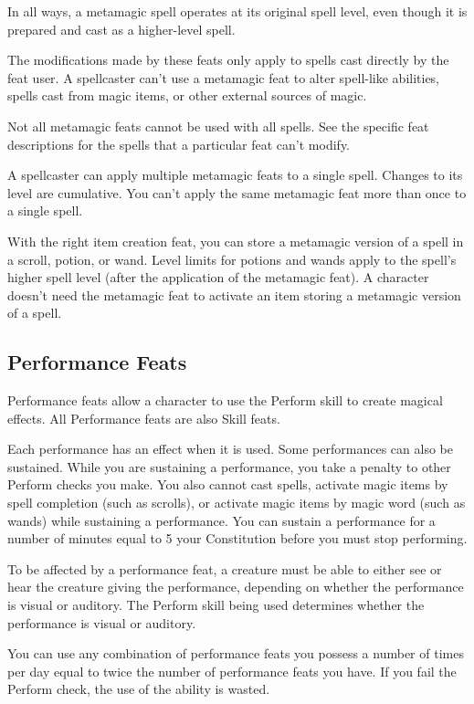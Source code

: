In all ways, a metamagic spell operates at its original spell level, even though it is prepared and cast as a higher-level spell.

The modifications made by these feats only apply to spells cast directly by the feat user.
A spellcaster can't use a metamagic feat to alter spell-like abilities, spells cast from magic items, or other external sources of magic.

Not all metamagic feats cannot be used with all spells.
See the specific feat descriptions for the spells that a particular feat can't modify.

A spellcaster can apply multiple metamagic feats to a single spell.
Changes to its level are cumulative.
You can't apply the same metamagic feat more than once to a single spell.

With the right item creation feat, you can store a metamagic version of a spell in a scroll, potion, or wand.
Level limits for potions and wands apply to the spell's higher spell level (after the application of the metamagic feat).
A character doesn't need the metamagic feat to activate an item storing a metamagic version of a spell.

\subsection{Performance Feats}
Performance feats allow a character to use the Perform skill to create magical effects.
All Performance feats are also Skill feats.

Each performance has an effect when it is used.
Some performances can also be sustained.
While you are sustaining a performance, you take a  penalty to other Perform checks you make.
You also cannot cast spells, activate magic items by spell completion (such as scrolls), or activate magic items by magic word (such as wands) while sustaining a performance.
You can sustain a performance for a number of minutes equal to 5 \add your Constitution before you must stop performing.

To be affected by a performance feat, a creature must be able to either see or hear the creature giving the performance, depending on whether the performance is visual or auditory.
The Perform skill being used determines whether the performance is visual or auditory.

You can use any combination of performance feats you possess a number of times per day equal to twice the number of performance feats you have.
If you fail the Perform check, the use of the ability is wasted.

